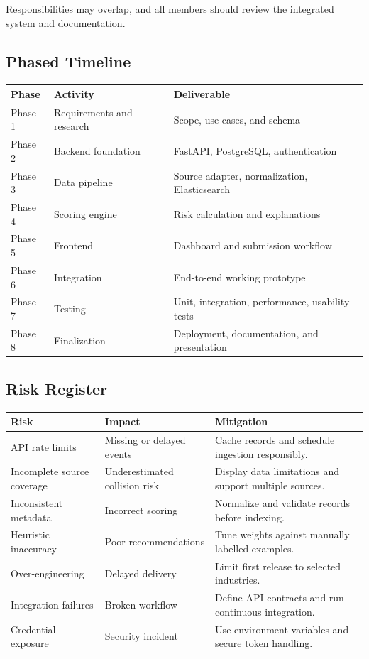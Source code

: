 \documentclass[12pt]{article}
\begin{document}
Responsibilities may overlap, and all members should review the integrated system and documentation.

\subsection{Phased Timeline}
\begin{longtable}{p{}p{}p{}}
\toprule
\textbf{Phase} & \textbf{Activity} & \textbf{Deliverable}\\
\midrule
Phase 1 & Requirements and research & Scope, use cases, and schema\\
Phase 2 & Backend foundation & FastAPI, PostgreSQL, authentication\\
Phase 3 & Data pipeline & Source adapter, normalization, Elasticsearch\\
Phase 4 & Scoring engine & Risk calculation and explanations\\
Phase 5 & Frontend & Dashboard and submission workflow\\
Phase 6 & Integration & End-to-end working prototype\\
Phase 7 & Testing & Unit, integration, performance, usability tests\\
Phase 8 & Finalization & Deployment, documentation, and presentation\\
\bottomrule
\end{longtable}

\subsection{Risk Register}
\begin{longtable}{p{}p{}p{}}
\toprule
\textbf{Risk} & \textbf{Impact} & \textbf{Mitigation}\\
\midrule
API rate limits & Missing or delayed events & Cache records and schedule ingestion responsibly.\\
Incomplete source coverage & Underestimated collision risk & Display data limitations and support multiple sources.\\
Inconsistent metadata & Incorrect scoring & Normalize and validate records before indexing.\\
Heuristic inaccuracy & Poor recommendations & Tune weights against manually labelled examples.\\
Over-engineering & Delayed delivery & Limit first release to selected industries.\\
Integration failures & Broken workflow & Define API contracts and run continuous integration.\\
Credential exposure & Security incident & Use environment variables and secure token handling.\\
\bottomrule
\end{longtable}
\end{document}
